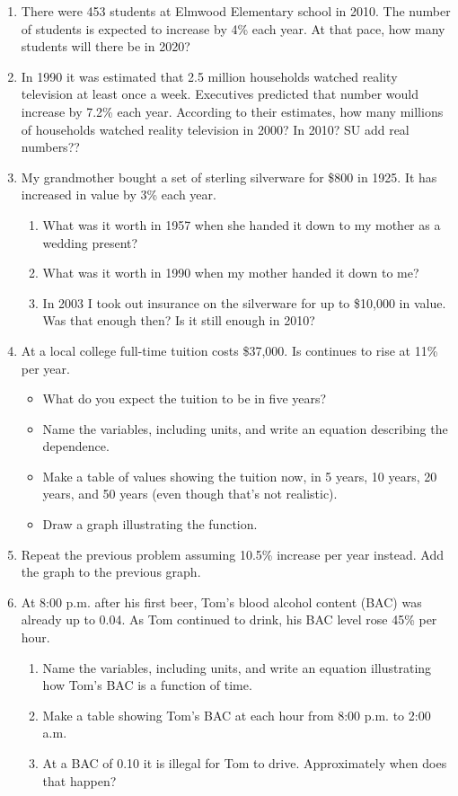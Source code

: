 \begin{enumerate}
\item There were 453 students at Elmwood Elementary school in 2010.  The number of students is expected to increase by 4\% each year. At that pace, how many students will there be in 2020?

\item In 1990 it was estimated that 2.5 million households watched reality television at least once a week.  Executives predicted that number would increase by 7.2\% each year.  According to their estimates, how many millions of households watched reality television in 2000?  In 2010?  SU add real numbers??

\item My grandmother bought a set of sterling silverware for \$800 in 1925.  It has increased in value by 3\% each year.  
\begin{enumerate}
\item What was it worth in 1957 when she handed it down to my mother as a wedding present?
\item What was it worth in 1990 when my mother handed it down to me?
\item In 2003 I took out insurance on the silverware for up to \$10,000 in value.  Was that enough then?  Is it still enough in 2010?
\end{enumerate}

\item At a local college full-time tuition costs \$37,000.  Is continues to rise at 11\% per year.
\begin{itemize}
\item What do you expect the tuition to be in five years?
\item Name the variables, including units, and write an equation describing the dependence.
\item Make a table of values showing the tuition now, in 5 years, 10 years, 20 years, and 50 years (even though that's not realistic).
\item Draw a graph illustrating the function.
\end{itemize}

\item Repeat the previous problem assuming 10.5\% increase per year instead.  Add the graph to the previous graph.

\item At 8:00 p.m. after his first beer, Tom's blood alcohol content (BAC) was already up to 0.04.  As Tom continued to drink, his BAC level rose 45\% per hour.
\begin{enumerate}
\item Name the variables, including units, and write an equation illustrating how Tom's BAC is a function of time.
\item Make a table showing Tom's BAC at each hour from 8:00 p.m. to 2:00 a.m.
\item At a BAC of 0.10 it is illegal for Tom to drive.  Approximately when does that happen?
\end{enumerate}



\end{enumerate}
